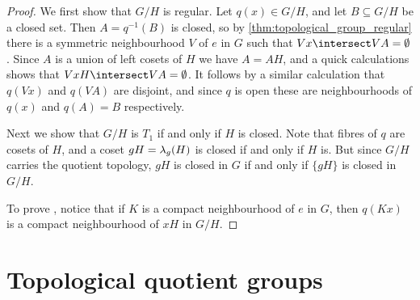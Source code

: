 \documentclass[article, a4paper, 11pt, oneside]{memoir}
\numberwithin{equation}{chapter}
\newcommand{\preim}{^{-1}}
\begin{document}
\begin{proof}
    We first show that $G/H$ is regular. Let $q(x) \in G/H$, and let $B \subseteq G/H$ be a closed set. Then $A = q\preim(B)$ is closed, so by \cref{thm:topological_group_regular} there is a symmetric neighbourhood $V$ of $e$ in $G$ such that $Vx \intersect VA = \emptyset$. Since $A$ is a union of left cosets of $H$ we have $A = AH$, and a quick calculations shows that $VxH \intersect VA = \emptyset$. It follows by a similar calculation that $q(Vx)$ and $q(VA)$ are disjoint, and since $q$ is open these are neighbourhoods of $q(x)$ and $q(A) = B$ respectively.

    Next we show that $G/H$ is $T_1$ if and only if $H$ is closed. Note that fibres of $q$ are cosets of $H$, and a coset $gH = \lambda_g(H)$ is closed if and only if $H$ is. But since $G/H$ carries the quotient topology, $gH$ is closed in $G$ if and only if $\{gH\}$ is closed in $G/H$.


    To prove , notice that if $K$ is a compact neighbourhood of $e$ in $G$, then $q(Kx)$ is a compact neighbourhood of $xH$ in $G/H$.
\end{proof}



\section{Topological quotient groups}
\end{document}
